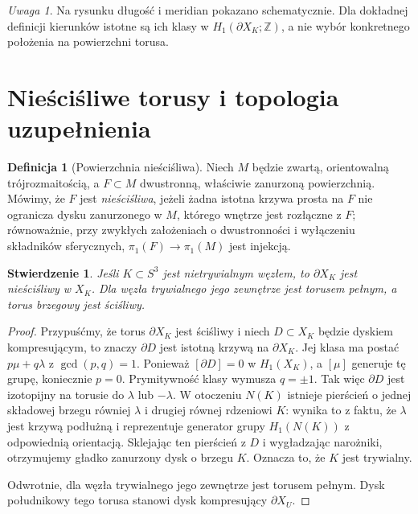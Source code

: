 \documentclass[11pt,a4paper]{report}
\numberwithin{equation}{section}
\theoremstyle{plain}
\newtheorem{stwierdzenie}[twierdzenie]{Stwierdzenie}
\theoremstyle{definition}
\newtheorem{definicja}[twierdzenie]{Definicja}
\theoremstyle{remark}
\newtheorem{uwaga}[twierdzenie]{Uwaga}
\begin{document}
\begin{uwaga}
Na rysunku długość i meridian pokazano schematycznie.
Dla dokładnej definicji kierunków istotne są ich klasy w
$H_1(\partial X_K;\mathbb Z)$, a nie wybór konkretnego
położenia na powierzchni torusa.
\end{uwaga}

\section{Nieściśliwe torusy i topologia uzupełnienia}
\label{sec:kt-torus-jsj}

\begin{definicja}[Powierzchnia nieściśliwa]
Niech $M$ będzie zwartą, orientowalną trójrozmaitością,
a $F\subset M$ dwustronną, właściwie zanurzoną powierzchnią.
Mówimy, że $F$ jest \emph{nieściśliwa}, jeżeli żadna istotna
krzywa prosta na $F$ nie ogranicza dysku zanurzonego w $M$,
którego wnętrze jest rozłączne z $F$; równoważnie, przy zwykłych
założeniach o dwustronności i wyłączeniu składników sferycznych,
$\pi_1(F)\to\pi_1(M)$ jest injekcją.
\end{definicja}

\begin{stwierdzenie}
Jeśli $K\subset S^3$ jest nietrywialnym węzłem, to
$\partial X_K$ jest nieściśliwy w $X_K$.
Dla węzła trywialnego jego zewnętrze jest torusem pełnym,
a torus brzegowy jest ściśliwy.
\end{stwierdzenie}

\begin{proof}
Przypuśćmy, że torus $\partial X_K$ jest ściśliwy i niech
$D\subset X_K$ będzie dyskiem kompresującym, to znaczy
$\partial D$ jest istotną krzywą na $\partial X_K$.
Jej klasa ma postać $p\mu+q\lambda$ z
$\gcd(p,q)=1$. Ponieważ $[\partial D]=0$ w $H_1(X_K)$,
a $[\mu]$ generuje tę grupę, koniecznie $p=0$.
Prymitywność klasy wymusza $q=\pm1$.
Tak więc $\partial D$ jest izotopijny na torusie do
$\lambda$ lub $-\lambda$. W otoczeniu $N(K)$ istnieje
pierścień o jednej składowej brzegu równiej $\lambda$
i drugiej równej rdzeniowi $K$: wynika to z faktu, że
$\lambda$ jest krzywą podłużną i reprezentuje generator
grupy $H_1(N(K))$ z odpowiednią orientacją.
Sklejając ten pierścień z $D$ i wygładzając narożniki,
otrzymujemy gładko zanurzony dysk o brzegu $K$.
Oznacza to, że $K$ jest trywialny.

Odwrotnie, dla węzła trywialnego jego zewnętrze jest
torusem pełnym. Dysk południkowy tego torusa stanowi
dysk kompresujący $\partial X_U$.
\end{proof}
\end{document}
